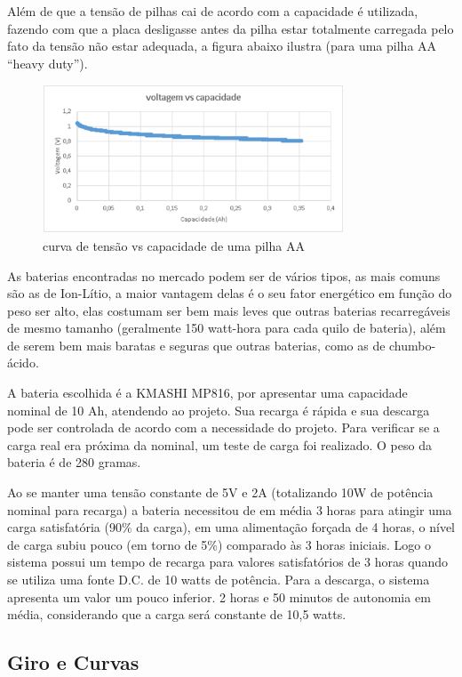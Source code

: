 Além de que a tensão de pilhas cai de acordo com a capacidade é utilizada, fazendo com que a placa desligasse antes da pilha estar totalmente carregada pelo fato da tensão não estar adequada, a figura abaixo ilustra (para uma pilha AA “heavy duty”).

\begin{figure}[H]
    \centering
    \includegraphics[width=0.8\textwidth]{figuras/volt_vs_cap.eps}
    \caption{curva de tensão vs capacidade de uma pilha AA}
    \label{fig:volts}
\end{figure}

As baterias encontradas no mercado podem ser de vários tipos, as mais comuns são as de Ion-Lítio, a maior vantagem delas é o seu fator energético em função do peso ser alto, elas costumam ser bem mais leves que outras baterias recarregáveis de mesmo tamanho (geralmente 150 watt-hora para cada quilo de bateria), além de serem bem mais baratas e seguras que outras baterias, como as de chumbo-ácido.

A bateria escolhida é a KMASHI MP816, por apresentar uma capacidade nominal de 10 Ah, atendendo ao projeto. Sua recarga é rápida e sua descarga pode ser controlada de acordo com a necessidade do projeto.  Para verificar se a carga real era próxima da nominal, um teste de carga foi realizado. O peso da bateria é de 280 gramas.

Ao se manter uma tensão constante de 5V e 2A (totalizando 10W de potência nominal para recarga) a bateria necessitou de em média 3 horas para atingir uma carga satisfatória (90\% da carga), em uma alimentação forçada de 4 horas, o nível de carga subiu pouco (em torno de 5\%) comparado às 3 horas iniciais. Logo o sistema possui um tempo de recarga para valores satisfatórios de 3 horas quando se utiliza uma fonte D.C. de 10 watts de potência. Para a descarga, o sistema apresenta um valor um pouco inferior. 2 horas e 50 minutos de autonomia em média, considerando que a carga será constante de 10,5 watts.

\subsection{Giro e Curvas}

